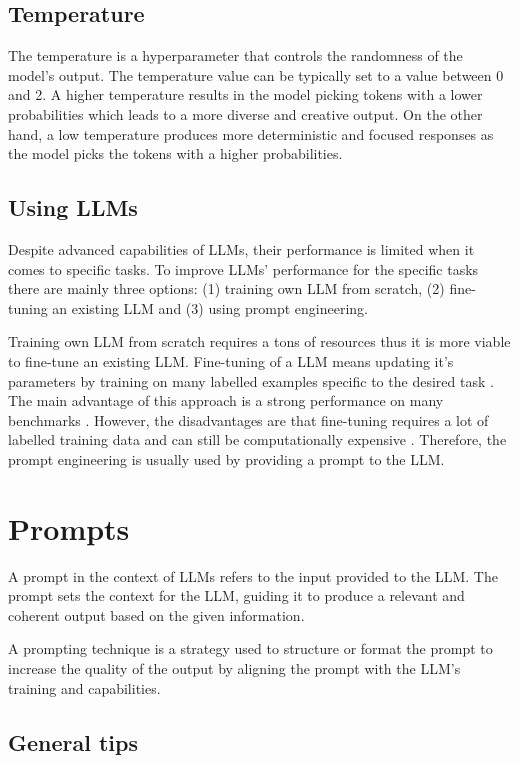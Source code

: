 \subsection{Temperature}
\label{temperature}
The temperature is a hyperparameter that controls the randomness of the model's output. The temperature value can be typically set to a value between 0 and 2. A higher temperature results in the model picking tokens with a lower probabilities which leads to a more diverse and creative output. On the other hand, a low temperature produces more deterministic and focused responses as the model picks the tokens with a higher probabilities.


\subsection{Using LLMs}

Despite advanced capabilities of LLMs, their performance is limited when it comes to specific tasks. To improve LLMs' performance for the specific tasks there are mainly three options: (1) training own LLM from scratch, (2) fine-tuning an existing LLM and (3) using prompt engineering.

Training own LLM from scratch requires a tons of resources \cite{Zhao2023} thus it is more viable to fine-tune an existing LLM. Fine-tuning of a LLM means updating it's parameters by training on many labelled examples specific to the desired task \cite{Brown2020}. The main advantage of this approach is a strong performance on many benchmarks \cite{Brown2020}. However, the disadvantages are that fine-tuning requires a lot of labelled training data and can still be computationally expensive \cite{Brown2020}. Therefore, the prompt engineering is usually used by providing a prompt to the LLM.


\section{Prompts}

A prompt in the context of LLMs refers to the input provided to the LLM. The prompt sets the context for the LLM, guiding it to produce a relevant and coherent output based on the given information.

A prompting technique is a strategy used to structure or format the prompt to increase the quality of the output by aligning the prompt with the LLM's training and capabilities.


\subsection{General tips}
\label{prompt_general_tips}

